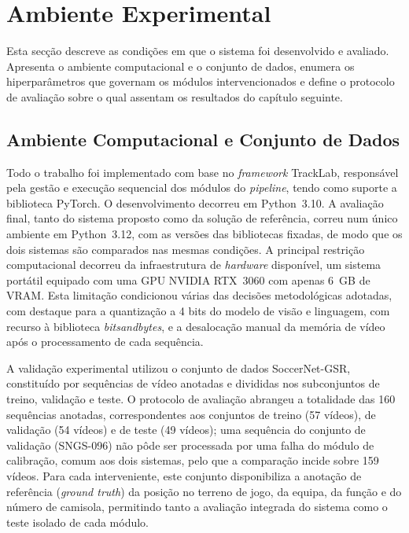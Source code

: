 \FloatBarrier

\section{Ambiente Experimental}

Esta secção descreve as condições em que o sistema foi desenvolvido e avaliado. Apresenta o ambiente
computacional e o conjunto de dados, enumera os hiperparâmetros que governam os módulos
intervencionados e define o protocolo de avaliação sobre o qual assentam os resultados do capítulo
seguinte.

\subsection{Ambiente Computacional e Conjunto de Dados}\label{sec:ambiente}

Todo o trabalho foi implementado com base no \emph{framework} TrackLab, responsável pela gestão e
execução sequencial dos módulos do \emph{pipeline}, tendo como suporte a biblioteca PyTorch. O
desenvolvimento decorreu em Python~3.10. A avaliação final, tanto do sistema proposto como da
solução de referência, correu num único ambiente em Python~3.12, com as versões das bibliotecas
fixadas, de modo que os dois sistemas são comparados nas mesmas condições.
A principal restrição computacional decorreu da infraestrutura de \emph{hardware}
disponível, um sistema portátil equipado com uma GPU NVIDIA RTX~3060 com apenas 6~GB de VRAM. Esta
limitação condicionou várias das decisões metodológicas adotadas, com destaque para a quantização a
4 bits do modelo de visão e linguagem, com recurso à biblioteca \emph{bitsandbytes}, e a desalocação
manual da memória de vídeo após o processamento de cada sequência.

A validação experimental utilizou o conjunto de dados SoccerNet-GSR, constituído por
sequências de vídeo anotadas e divididas nos subconjuntos de treino, validação e teste.
O protocolo de avaliação abrangeu a totalidade das 160 sequências anotadas,
correspondentes aos conjuntos de treino (57 vídeos), de validação (54 vídeos) e de teste
(49 vídeos); uma sequência do conjunto de validação (SNGS-096) não pôde ser processada por
uma falha do módulo de calibração, comum aos dois sistemas, pelo que a comparação incide
sobre 159 vídeos. Para cada interveniente, este conjunto disponibiliza a anotação de
referência (\emph{ground truth}) da posição no terreno de jogo, da equipa, da função e do
número de camisola, permitindo tanto a avaliação integrada do sistema como o teste
isolado de cada módulo.

